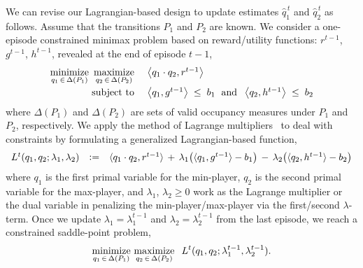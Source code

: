 \documentclass[12pt, final]{l4dc2023}
\begin{document}
We can revise our Lagrangian-based design to update estimates $\hat q_1^{\,t}$ and $\hat q_2^{\,t}$ as follows. 
Assume that the transitions $P_1$ and $P_2$ are known. We consider a one-episode constrained minimax problem based on reward/utility functions: $r^{t-1}$, $g^{t-1}$, $h^{t-1}$, revealed at the end of episode $t-1$,
\[
\begin{array}{rcl}
\minimize\limits_{q_1\,\in\,\Delta(P_1)} \,\,\maximize\limits_{q_2\,\in\,\Delta(P_2)}
&& \!\!\!\! \inner{q_1\cdot q_2}{r^{t-1}}
\\[0.3cm]
\subject && \!\!\!\!
\inner{q_1}{g^{t-1}} \;\leq\; b_1
\; \text{ and }\;
\inner{q_2}{h^{t-1}} \;\leq\; b_2
\end{array}
\]
where $\Delta(P_1)$ and $\Delta(P_2)$ are sets of valid occupancy measures under $P_1$ and $P_2$, respectively. We apply the method of Lagrange multipliers~\citep{bertsekas2014constrained} to deal with constraints by formulating a generalized Lagrangian-based function,
\[
\begin{array}{rcl}
L^t(q_1,q_2;\lambda_1,\lambda_2) 
&\mathrel{\mathop:}=&
\langle{q_1\cdot q_2},{r^{t-1}}\rangle
\,+\,
\lambda_1 \big( \langle{q_1},{g^{t-1}}\rangle - b_1 \big)
\,-\,
\lambda_2 \big( \langle{ q_2},{h^{t-1}}\rangle- b_2 \big)
\end{array}
\]
where $q_1$ is the first primal variable for the min-player, $q_2$ is the second primal variable for the max-player, and $\lambda_1$, $\lambda_2\geq 0$ work as the Lagrange multiplier or the dual variable in penalizing the min-player/max-player via the first/second $\lambda$-term.  Once we update $\lambda_1=\lambda_1^{t-1}$ and $\lambda_2=\lambda_2^{t-1}$ from the last episode, we reach a constrained saddle-point problem, 
$$\operatorname*{minimize}_{q_1\,\in\,\Delta(P_1)}\,\operatorname*{maximize}_{q_2\,\in\,\Delta(P_2)}\;\; L^t(q_1,q_2;\lambda_1^{t-1},\lambda_2^{t-1}).$$
\end{document}
